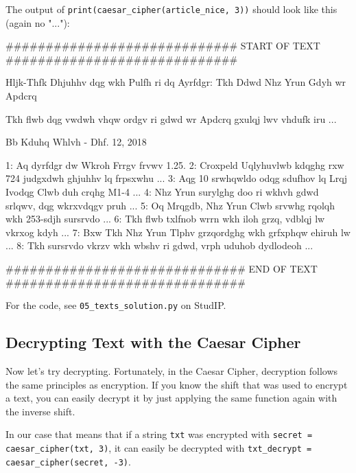 \vspace{1em}

\noindent The output of \texttt{print(caesar\_cipher(article\_nice, 3))} should look like this (again no "..."):

\begin{outputcode}

############################# START OF TEXT #############################

Hljk-Thfk Dhjuhhv dqg wkh Pulfh ri dq Ayrfdgr: Tkh Ddwd Nhz Yrun Gdyh wr Apdcrq

Tkh flwb dqg vwdwh vhqw ordgv ri gdwd wr Apdcrq gxulqj lwv vhdufk iru ...

Bb Kduhq Whlvh - Dhf. 12, 2018

1: Aq dyrfdgr dw Wkroh Frrgv frvwv 1.25. 
2: Croxpeld Uqlyhuvlwb kdqghg rxw 724 judgxdwh ghjuhhv lq frpsxwhu ...
3: Aqg 10 srwhqwldo odqg sdufhov lq Lrqj Ivodqg Clwb duh crqhg M1-4 ...
4: Nhz Yrun surylghg doo ri wkhvh gdwd srlqwv, dqg wkrxvdqgv pruh ...
5: Oq Mrqgdb, Nhz Yrun Clwb srvwhg rqolqh wkh 253-sdjh sursrvdo ... 
6: Tkh flwb txlfnob wrrn wkh iloh grzq, vdblqj lw vkrxog kdyh ...
7: Bxw Tkh Nhz Yrun Tlphv grzqordghg wkh grfxphqw ehiruh lw ...
8: Tkh sursrvdo vkrzv wkh wbshv ri gdwd, vrph uduhob dydlodeoh ...

############################## END OF TEXT ##############################

\end{outputcode}

\vspace{1em}

\begin{solution}

\noindent For the code, see \texttt{05\_texts\_solution.py} on StudIP.

\end{solution}

\subsection{Decrypting Text with the Caesar Cipher}

Now let's try decrypting. Fortunately, in the Caesar Cipher, decryption follows the same principles as encryption. If you know the shift that was used to encrypt a text, you can easily decrypt it by just applying the same function again with the inverse shift. 

\vspace{1em}

\noindent In our case that means that if a string \texttt{txt} was encrypted with \texttt{secret = caesar\_cipher(txt, 3)}, it can easily be decrypted with \texttt{txt\_decrypt = caesar\_cipher(secret, -3)}. 

